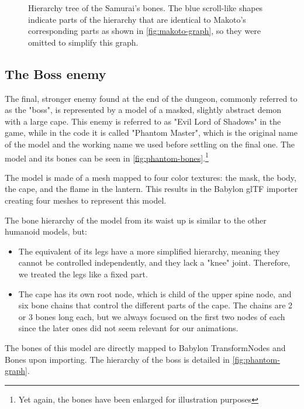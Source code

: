 \begin{figure}[H]
    \centering
    
    \caption{Hierarchy tree of the Samurai's bones. The blue scroll-like shapes indicate parts of the hierarchy that are identical to Makoto's corresponding parts as shown in \autoref{fig:makoto-graph}, so they were omitted to simplify this graph.}
    \label{fig:samurai-graph}
\end{figure}


\subsection{The Boss enemy}

The final, stronger enemy found at the end of the dungeon, commonly referred to as the "boss", is represented by a model of a masked, slightly abstract demon with a large cape. This enemy is referred to as "Evil Lord of Shadows" in the game, while in the code it is called "Phantom Master", which is the original name of the model and the working name we used before settling on the final one. The model and its bones can be seen in \autoref*{fig:phantom-bones}.\footnote{Yet again, the bones have been enlarged for illustration purposes}

The model is made of a mesh mapped to four color textures: the mask, the body, the cape, and the flame in the lantern. This results in the Babylon glTF importer creating four meshes to represent this model.

The bone hierarchy of the model from its waist up is similar to the other humanoid models, but:

\begin{itemize}
    \item The equivalent of its legs have a more simplified hierarchy, meaning they cannot be controlled independently, and they lack a "knee" joint. Therefore, we treated the legs like a fixed part.
    \item The cape has its own root node, which is child of the upper spine node, and six bone chains that control the different parts of the cape. The chains are 2 or 3 bones long each, but we always focused on the first two nodes of each since the later ones did not seem relevant for our animations.
\end{itemize}

The bones of this model are directly mapped to Babylon TransformNodes and Bones upon importing. The hierarchy of the boss is detailed in \autoref*{fig:phantom-graph}.

